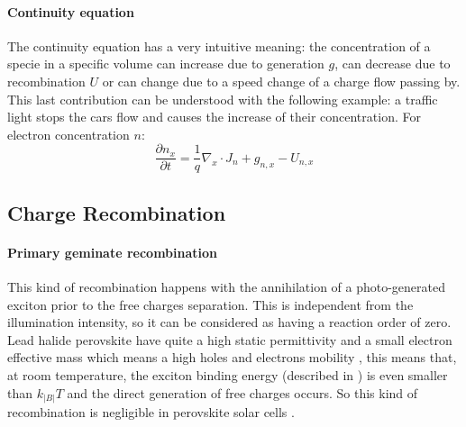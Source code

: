 		\paragraph{Continuity equation}
		The continuity equation has a very intuitive meaning: the concentration of a specie in a specific volume can increase due to generation $g$, can decrease due to recombination $U$ or can change due to a speed change of a charge flow passing by.
		This last contribution can be understood with the following example: a traffic light stops the cars flow and causes the increase of their concentration.
		For electron concentration $n$:
		\begin{equation}\label{eq_continuity}
			\frac{\partial n_x}{\partial t} = \frac{1}{q}\nabla_x \cdot J_n + g_{n,x} - U_{n,x}
		\end{equation}

	\subsection{Charge Recombination}

		\paragraph{Primary geminate recombination} \label{intro_geminate}
		This kind of recombination happens with the annihilation of a photo-generated exciton prior to the free charges separation.
		This is independent from the illumination intensity, so it can be considered as having a reaction order of zero.
		Lead halide perovskite have quite a high static permittivity \cite{Moia2019} and a small electron effective mass \cite{Herz2017} which means a high holes and electrons mobility \cite{Leijtens2014}, this means that, at room temperature, the exciton binding energy (described in ) is even smaller than $k_|B|T$ \cite{Miyata2015,Galkowski2016,Tvingstedt2015} and the direct generation of free charges occurs.
		So this kind of recombination is negligible in perovskite solar cells \cite{Wehrenfennig2014}.

